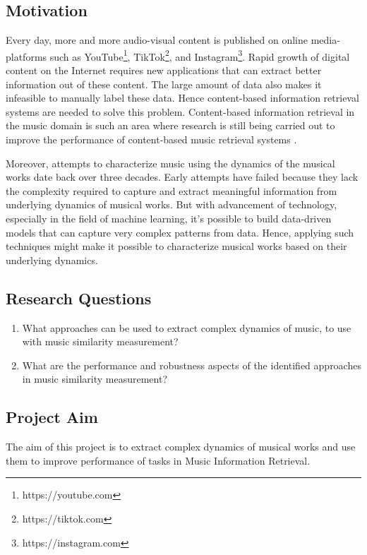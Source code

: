 \documentclass[../main.tex]{subfiles}
\begin{document}
\newpage
\subsection{Motivation}

\par
Every day, more and more audio-visual content is published on online media-platforms such as YouTube\footnote{https://youtube.com}, TikTok\footnote{https://tiktok.com}, and Instagram\footnote{https://instagram.com}. Rapid growth of digital content on the Internet requires new applications that can extract better information out of these content. The large amount of data also makes it infeasible to manually label these data. Hence content-based information retrieval systems are needed to solve this problem. Content-based information retrieval in the music domain is such an area where research is still being carried out to improve the performance of content-based music retrieval systems \cite{yesilerInvestigatingEfficacyMusic2021,jiang_yang_chen_2020,yu_contrastive_2020}.

\par
Moreover, attempts to characterize music using the dynamics of the musical works date back over three decades. Early attempts have failed because they lack the complexity required to capture and extract meaningful information from underlying dynamics of musical works. But with advancement of technology, especially in the field of machine learning, it's possible to build data-driven models that can capture very complex patterns from data. Hence, applying such techniques might make it possible to characterize musical works based on their underlying dynamics.


\subsection{Research Questions}

\normalsize
\begin{enumerate}
  \item What approaches can be used to extract complex dynamics of music, to use with music similarity measurement?
  \item What are the performance and robustness aspects of the identified approaches in music similarity measurement?
\end{enumerate}

\subsection{Project Aim}
The aim of this project is to extract complex dynamics of musical works and use them to improve performance of tasks in Music Information Retrieval.
\end{document}
